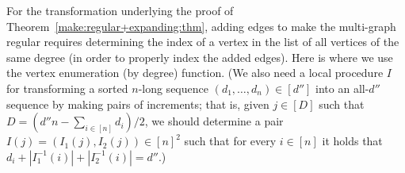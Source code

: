 For the transformation underlying
the proof of Theorem~\ref{make:regular+expanding:thm},
adding edges to make the multi-graph regular requires
determining the index of a vertex in the list of all vertices
of the same degree (in order to properly index the added edges).
Here is where we use the vertex enumeration (by degree) function.
(We also need a local procedure $I$ for transforming
a sorted $n$-long sequence $(d_1,\ldots,d_n)\in[d'']$
into an all-$d''$ sequence by making pairs of increments;
that is, given $j\in[D]$ such that $D=(d''n-\sum_{i\in[n]}d_i)/2$,
we should determine a pair $I(j)=(I_1(j),I_2(j))\in[n]^2$
such that for every $i\in[n]$ it holds
that $d_i+|I_1^{-1}(i)|+|I_2^{-1}(i)|=d''$.)
\EPF
























































































